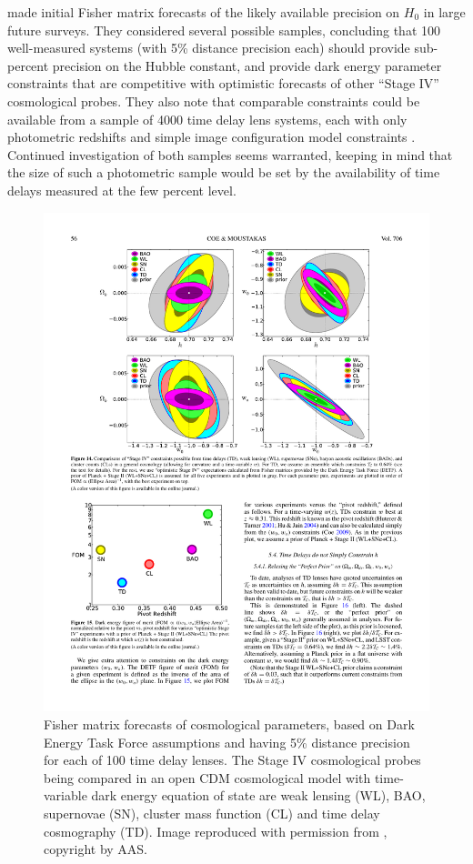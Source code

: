 \citet{C+M09b} made initial Fisher matrix forecasts of the likely
available precision on $H_0$ in large future surveys. They considered
several possible samples, concluding that 100 well-measured systems
(with 5\% distance precision each) should provide sub-percent precision
on the Hubble constant, and provide  dark energy parameter constraints
that are competitive with optimistic forecasts of other ``Stage IV''
cosmological probes. They also note that comparable constraints could be
available from a sample of 4000 time delay lens systems, each with only
photometric redshifts and simple image configuration model constraints
\citep[following][]{Ogu07b,P+J10}.  Continued investigation of both samples
seems warranted, keeping in mind that the size of such a photometric
sample would be set by the availability of time delays measured at the
few percent level.

\begin{figure}[!ht]
\centering\includegraphics[width=0.9\linewidth]{figures/Coe+Moustakas09_fig14.pdf}
\caption{Fisher matrix forecasts of cosmological parameters, based on
Dark Energy Task Force assumptions and having 5\% distance precision
for each of 100 time delay lenses. The Stage IV cosmological probes
being compared in an  open CDM cosmological model with time-variable
dark energy equation of state are weak lensing (WL), BAO, supernovae
(SN), cluster mass function (CL) and time delay cosmography (TD).
Image reproduced with permission from \citet{C+M09b}, copyright by AAS.}
\label{fig:fisher}
\end{figure}


